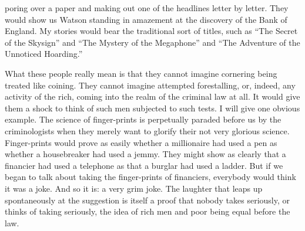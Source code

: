 \documentclass{book}
\begin{document}
poring over a paper and making out one of the headlines letter by letter. They would show us Watson standing in amazement at the discovery of the Bank of England. My stories would bear the traditional sort of titles, such as “The Secret of the Skysign” and “The Mystery of the Megaphone” and “The Adventure of the Unnoticed Hoarding.”

What these people really mean is that they cannot imagine cornering being treated like coining. They cannot imagine attempted forestalling, or, indeed, any activity of the rich, coming into the realm of the criminal law at all. It would give them a shock to think of such men subjected to such tests. I will give one obvious example. The science of finger-prints is perpetually paraded before us by the criminologists when they merely want to glorify their not very glorious science. Finger-prints would prove as easily whether a millionaire had used a pen as whether a housebreaker had used a jemmy. They might show as clearly that a financier had used a telephone as that a burglar had used a ladder. But if we began to talk about taking the finger-prints of financiers, everybody would think it was a joke. And so it is: a very grim joke. The laughter that leaps up spontaneously at the suggestion is itself a proof that nobody takes seriously, or thinks of taking seriously, the idea of rich men and poor being equal before the law.
\end{document}
